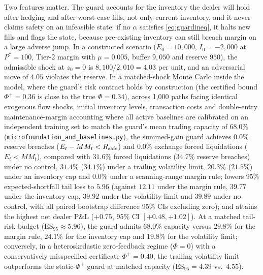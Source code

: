 \documentclass[12pt]{article}
\theoremstyle{definition}
\theoremstyle{remark}
\begin{document}
Two features matter. The guard accounts for the inventory the dealer will hold after hedging and after worst-case fills, not only current inventory, and it never claims safety on an infeasible state: if no $\alpha$ satisfies \eqref{eq:guardineq}, it halts new fills and flags the state, because pre-existing inventory can still breach margin on a large adverse jump. In a constructed scenario ($E_0=10{,}000$, $I_0=-2{,}000$ at $P^*=100$, Tier-2 margin with $\mu=0.005$, buffer $9{,}050$ and reserve $950$), the admissible shock at $z_0=0$ is $8{,}100/2{,}010=4.03$ per unit, and an adversarial move of $4.05$ violates the reserve. In a matched-shock Monte Carlo inside the model, where the guard's risk contract holds by construction (the certified bound $\Phi^+=0.36$ is close to the true $\Phi=0.34$), across 1{,}000 paths facing identical exogenous flow shocks, initial inventory levels, transaction costs and double-entry maintenance-margin accounting where all active baselines are calibrated on an independent training set to match the guard's mean trading capacity of $68.0\%$ (\texttt{microfoundation\_and\_baselines.py}), the summed-gain guard achieves $0.0\%$ reserve breaches ($E_t-MM_t<R_{\rm safe}$) and $0.0\%$ exchange forced liquidations ($E_t<MM_t$), compared with $31.6\%$ forced liquidations ($34.7\%$ reserve breaches) under no control, $31.4\%$ ($34.1\%$) under a trailing volatility limit, $20.3\%$ ($21.5\%$) under an inventory cap and $0.0\%$ under a scanning-range margin rule; lowers 95\% expected-shortfall tail loss to $5.96$ (against $12.11$ under the margin rule, $39.77$ under the inventory cap, $39.92$ under the volatility limit and $39.89$ under no control, with all paired bootstrap difference 95\% CIs excluding zero); and attains the highest net dealer P\&L ($+0.75$, 95\% CI $[+0.48,+1.02]$). At a matched tail-risk budget ($\mathrm{ES}_{95}\approx 5.96$), the guard admits $68.0\%$ capacity versus $29.8\%$ for the margin rule, $24.1\%$ for the inventory cap and $19.8\%$ for the volatility limit; conversely, in a heteroskedastic zero-feedback regime ($\Phi=0$) with a conservatively misspecified certificate $\Phi^+=0.40$, the trailing volatility limit outperforms the static-$\Phi^+$ guard at matched capacity ($\mathrm{ES}_{95}=4.39$ vs.\ $4.55$).
\end{document}
